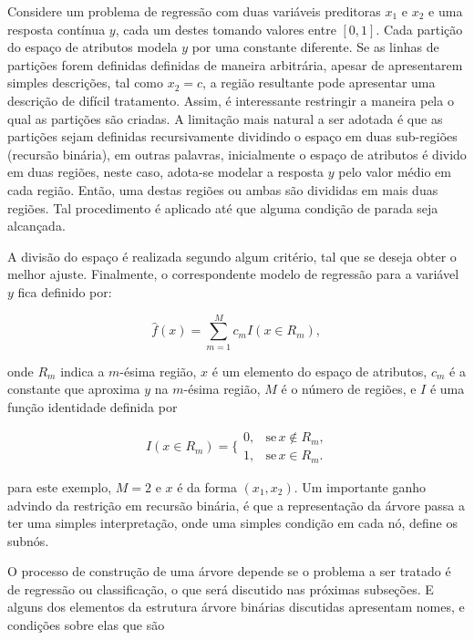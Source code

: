 Considere um problema de regressão com duas variáveis preditoras $x_1$ e $x_2$ e uma resposta contínua $y$, cada um destes tomando valores entre $[0,1]$. Cada partição do espaço de atributos modela $y$ por uma constante diferente. Se as linhas de partições forem definidas definidas de maneira arbitrária, apesar de apresentarem simples descrições, tal como $x_2=c$, a região resultante pode apresentar uma descrição de difícil tratamento. Assim, é interessante restringir a maneira pela o qual as partições são criadas. A limitação mais natural a ser adotada é que as partições sejam definidas recursivamente dividindo o espaço em duas sub-regiões (recursão binária), em outras palavras, inicialmente o espaço de atributos é divido em duas regiões, neste caso, adota-se modelar a resposta $y$ pelo valor médio em cada região. Então, uma destas regiões ou ambas são divididas em mais duas regiões. Tal procedimento é aplicado até que alguma condição de parada seja alcançada. 

A divisão do espaço é realizada segundo algum critério, tal que se deseja obter o melhor ajuste. Finalmente, o correspondente modelo de regressão para a variável $y$ fica definido por:

\begin{equation}\label{eq:treeresponse}
\hat{f}(x)=\sum_{m=1}^Mc_mI(x\in{R_m})\mbox{,}~
\end{equation}

onde $R_m$ indica a $m$-ésima região, $x$ é um elemento do espaço de atributos, $c_m$ é a constante que aproxima $y$ na $m$-ésima região, $M$ é o número de regiões, e $I$ é uma função identidade definida por

\begin{equation}
I(x\in{R_m})=\Big\{\begin{array}{cc}
0,&\mbox{se}\, x\notin{R_m}\mbox{,}\\ 
1,&\mbox{se}\, x\in{R_m}\mbox{.}
\end{array}
\end{equation}

\noindent
para este exemplo, $M=2$ e $x$ é da forma $(x_1, x_2)$. Um importante ganho advindo da restrição em recursão binária, é que a representação da árvore passa a ter uma simples interpretação, onde uma simples condição em cada nó, define os subnós. 

O processo de construção de uma árvore depende se o problema a ser tratado é de regressão ou classificação, o que será discutido nas próximas subseções. E alguns dos elementos da estrutura árvore binárias discutidas apresentam nomes, e condições sobre elas que são

